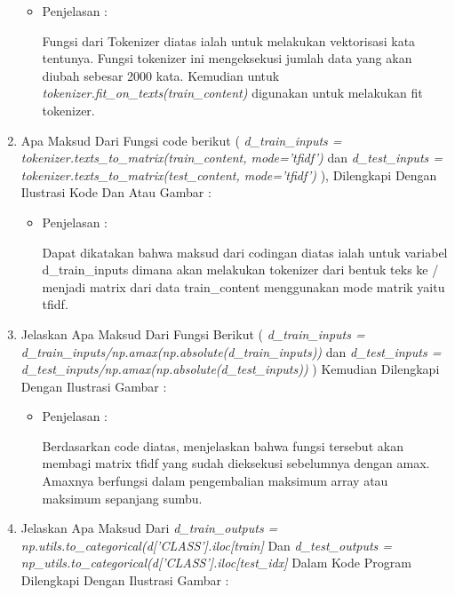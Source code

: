 \begin{enumerate}
\begin{itemize}
\item Penjelasan	:
\par  Fungsi dari Tokenizer diatas ialah untuk melakukan vektorisasi kata tentunya. Fungsi tokenizer ini mengeksekusi jumlah data yang akan diubah sebesar 2000 kata. Kemudian untuk  \emph{tokenizer.fit\_on\_texts(train\_content)} digunakan untuk melakukan fit tokenizer.
\par
\par
\end{itemize}
\par
\item Apa Maksud Dari Fungsi code berikut ( \emph{d\_train\_inputs = tokenizer.texts\_to\_matrix(train\_content, mode='tfidf')} dan \emph{d\_test\_inputs = tokenizer.texts\_to\_matrix(test\_content, mode='tfidf')} ), Dilengkapi Dengan Ilustrasi Kode Dan Atau Gambar :
\begin{itemize}
\item Penjelasan	:
\par Dapat dikatakan bahwa maksud dari codingan diatas ialah untuk variabel d\_train\_inputs dimana akan melakukan tokenizer dari bentuk teks ke / menjadi matrix dari data train\_content menggunakan mode matrik yaitu tfidf.
\par
\par
\end{itemize}
\par
\item Jelaskan Apa Maksud Dari Fungsi Berikut ( \emph{d\_train\_inputs = d\_train\_inputs/np.amax(np.absolute(d\_train\_inputs))} dan \emph{d\_test\_inputs = d\_test\_inputs/np.amax(np.absolute(d\_test\_inputs))} ) Kemudian Dilengkapi Dengan Ilustrasi Gambar :
\begin{itemize}
\item Penjelasan : 
\par Berdasarkan code diatas, menjelaskan bahwa fungsi tersebut akan membagi matrix tfidf yang sudah dieksekusi sebelumnya dengan amax. Amaxnya berfungsi dalam pengembalian maksimum array atau maksimum sepanjang sumbu.
\par
\par
\end{itemize}
\par
\par
\par
\item Jelaskan Apa Maksud Dari \emph{d\_train\_outputs = np.utils.to\_categorical(d['CLASS'].iloc[train]} Dan \emph{d\_test\_outputs = np\_utils.to\_categorical(d['CLASS'].iloc[test\_idx]} Dalam Kode Program Dilengkapi Dengan Ilustrasi Gambar :

\end{enumerate}
